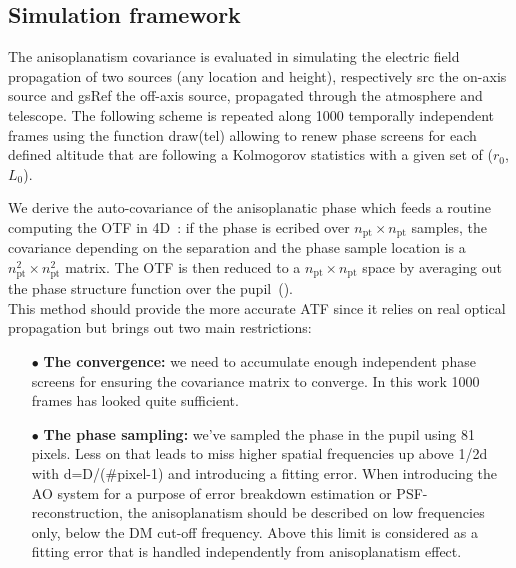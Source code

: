 \documentclass[12pt]{article}
\newcommand{\rz}{r_0}
\newcommand{\lz}{L_0}
\begin{document}
\subsection{Simulation framework}

The anisoplanatism covariance is evaluated in simulating the electric field propagation of two sources (any location and height), respectively src the on-axis source and gsRef the off-axis source, propagated through the atmosphere and telescope. The following scheme is repeated along 1000 temporally independent frames using the function draw(tel) allowing to renew phase screens for each defined altitude that are following a Kolmogorov statistics with a given set of ($\rz$,$\lz$).

We derive the auto-covariance of the anisoplanatic phase which feeds a routine computing the OTF in 4D~: if the phase is ecribed over $n_\text{pt}\times n_\text{pt}$ samples, the covariance depending on the separation and the phase sample location is a $n_\text{pt}^2 \times n_\text{pt}^2$ matrix. The OTF is then reduced to a $n_\text{pt}\times n_\text{pt}$ space by averaging out the phase structure function over the pupil~(\cite{GillesJOSA2008}).\\

This method should provide the more accurate ATF since it relies on real optical propagation but brings out two main restrictions:
\begin{itemize}
	\item[$\bullet$] \textbf{The convergence:} we need to accumulate enough independent phase screens for ensuring the covariance matrix to converge. In this work 1000 frames has looked quite sufficient.
	\item[$\bullet$] \textbf{The phase sampling:} we've sampled the phase in the pupil using 81 pixels. Less on that leads to miss higher spatial frequencies up above 1/2d with d=D/(\#pixel-1) and introducing a fitting error. When introducing the AO system for a purpose of error breakdown estimation or PSF-reconstruction, the anisoplanatism should be described on low frequencies only, below the DM cut-off frequency. Above this limit is considered as a fitting error that is handled independently from anisoplanatism effect.\\
\end{itemize}
\end{document}
